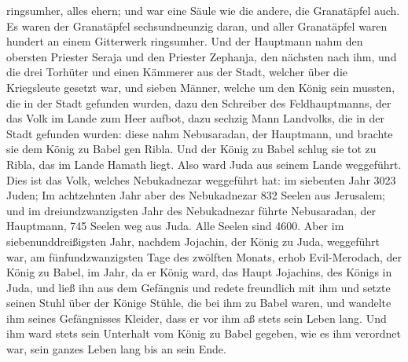 ringsumher, alles ehern; und war eine Säule wie die andere, die
Granatäpfel auch.  Es waren der Granatäpfel sechsundneunzig
daran, und aller Granatäpfel waren hundert an einem Gitterwerk
ringsumher.  Und der Hauptmann nahm den obersten Priester
Seraja und den Priester Zephanja, den nächsten nach ihm, und die drei
Torhüter  und einen Kämmerer aus der Stadt, welcher über
die Kriegsleute gesetzt war, und sieben Männer, welche um den König sein
mussten, die in der Stadt gefunden wurden, dazu den Schreiber des
Feldhauptmanns, der das Volk im Lande zum Heer aufbot, dazu sechzig Mann
Landvolks, die in der Stadt gefunden wurden:  diese nahm
Nebusaradan, der Hauptmann, und brachte sie dem König zu Babel gen
Ribla.  Und der König zu Babel schlug sie tot zu Ribla, das
im Lande Hamath liegt. Also ward Juda aus seinem Lande weggeführt.
 Dies ist das Volk, welches Nebukadnezar weggeführt hat: im
siebenten Jahr 3023 Juden;  Im achtzehnten Jahr aber des
Nebukadnezar 832 Seelen aus Jerusalem;  und im
dreiundzwanzigsten Jahr des Nebukadnezar führte Nebusaradan, der
Hauptmann, 745 Seelen weg aus Juda. Alle Seelen sind 4600. 
Aber im siebenunddreißigsten Jahr, nachdem Jojachin, der König zu Juda,
weggeführt war, am fünfundzwanzigsten Tage des zwölften Monats, erhob
Evil-Merodach, der König zu Babel, im Jahr, da er König ward, das Haupt
Jojachins, des Königs in Juda, und ließ ihn aus dem Gefängnis
 und redete freundlich mit ihm und setzte seinen Stuhl über
der Könige Stühle, die bei ihm zu Babel waren,  und
wandelte ihm seines Gefängnisses Kleider, dass er vor ihm aß stets sein
Leben lang.  Und ihm ward stets sein Unterhalt vom König zu
Babel gegeben, wie es ihm verordnet war, sein ganzes Leben lang bis an
sein Ende.
